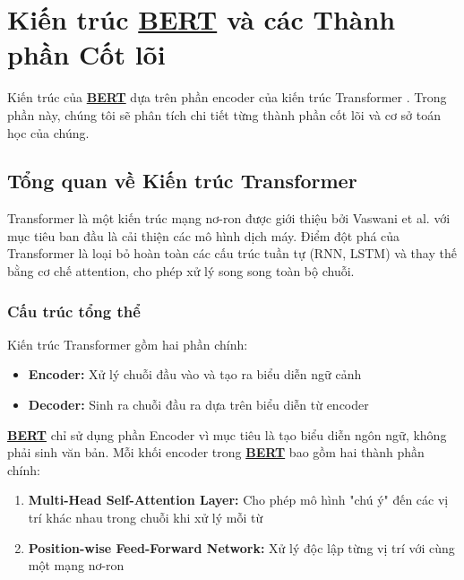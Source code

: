     \section{Kiến trúc \hyperref[acro:bert]{\textbf{BERT}} và các Thành phần Cốt lõi}
    \label{sec:kien_truc_bert}
    
    Kiến trúc của \hyperref[acro:bert]{\textbf{BERT}} dựa trên phần encoder của kiến trúc Transformer \cite{vaswani2017attention}. Trong phần này, chúng tôi sẽ phân tích chi tiết từng thành phần cốt lõi và cơ sở toán học của chúng.
    
    \subsection{Tổng quan về Kiến trúc Transformer}
    \label{ssec:tong_quan_transformer}
    
    Transformer là một kiến trúc mạng nơ-ron được giới thiệu bởi Vaswani et al. \cite{vaswani2017attention} với mục tiêu ban đầu là cải thiện các mô hình dịch máy. Điểm đột phá của Transformer là loại bỏ hoàn toàn các cấu trúc tuần tự (RNN, LSTM) và thay thế bằng cơ chế attention, cho phép xử lý song song toàn bộ chuỗi.
    
    \subsubsection{Cấu trúc tổng thể}
    Kiến trúc Transformer gồm hai phần chính:
    \begin{itemize}
        \item \textbf{Encoder:} Xử lý chuỗi đầu vào và tạo ra biểu diễn ngữ cảnh
        \item \textbf{Decoder:} Sinh ra chuỗi đầu ra dựa trên biểu diễn từ encoder
    \end{itemize}
    
    \hyperref[acro:bert]{\textbf{BERT}} chỉ sử dụng phần Encoder vì mục tiêu là tạo biểu diễn ngôn ngữ, không phải sinh văn bản. Mỗi khối encoder trong \hyperref[acro:bert]{\textbf{BERT}} bao gồm hai thành phần chính:
    
    \begin{enumerate}
        \item \textbf{Multi-Head Self-Attention Layer:} Cho phép mô hình "chú ý" đến các vị trí khác nhau trong chuỗi khi xử lý mỗi từ
        \item \textbf{Position-wise Feed-Forward Network:} Xử lý độc lập từng vị trí với cùng một mạng nơ-ron
    \end{enumerate}
    
